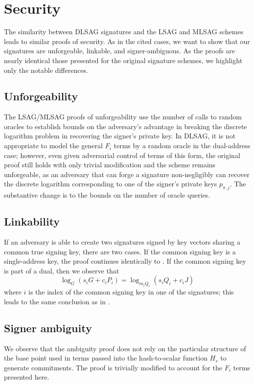 \documentclass{mrl}
\begin{document}
\section{Security}
The similarity between DLSAG signatures and the LSAG \cite{liu} and MLSAG \cite{shen} schemes leads to similar proofs of security. As in the cited cases, we want to show that our signatures are unforgeable, linkable, and signer-ambiguous. As the proofs are nearly identical those presented for the original signature schemes, we highlight only the notable differences.

\subsection{Unforgeability}
The LSAG/MLSAG proofs of unforgeability use the number of calls to random oracles to establish bounds on the adversary's advantage in breaking the discrete logarithm problem in recovering the signer's private key. In DLSAG, it is not appropriate to model the general $F_i$ terms by a random oracle in the dual-address case; however, even given adversarial control of terms of this form, the original proof \cite{shen} still holds with only trivial modification and the scheme remains unforgeable, as an adversary that can forge a signature non-negligibly can recover the discrete logarithm corresponding to one of the signer's private keys $p_{\pi,j}$. The substantive change is to the bounds on the number of oracle queries.

\subsection{Linkability}
If an adversary is able to create two signatures signed by key vectors sharing a common true signing key, there are two cases. If the common signing key is a single-address key, the proof continues identically to \cite{shen}. If the common signing key is part of a dual, then we observe that $$\log_G(s_iG + c_iP_i) = \log_{m_iQ_i}(s_iQ_i + c_iJ)$$ where $i$ is the index of the common signing key in one of the signatures; this leads to the same conclusion as in \cite{shen}.

\subsection{Signer ambiguity}
We observe that the ambiguity proof \cite{shen} does not rely on the particular structure of the base point used in terms passed into the hash-to-scalar function $H_s$ to generate commitments. The proof is trivially modified to account for the $F_i$ terms presented here. 
\end{document}
